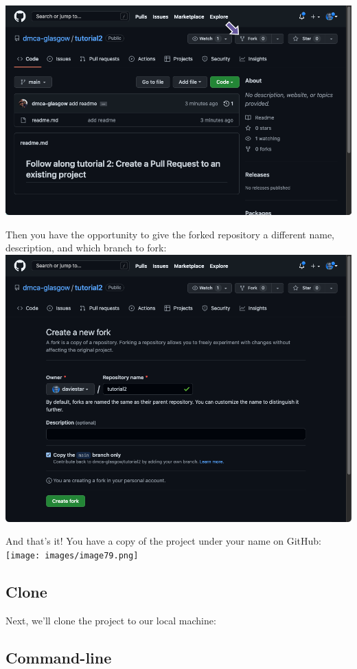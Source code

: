 \documentclass[
  letterpaper,
  DIV=11,
  numbers=noendperiod]{scrartcl}
\begin{document}
\includegraphics{images/image77.png}

Then you have the opportunity to give the forked repository a different
name, description, and which branch to fork:
\includegraphics{images/image78.png}

And that's it! You have a copy of the project under your name on GitHub:
\texttt{[image: images/image79.png]}

\subsection{Clone}\label{clone-1}

Next, we'll clone the project to our local machine:

\subsection{Command-line}
\end{document}
